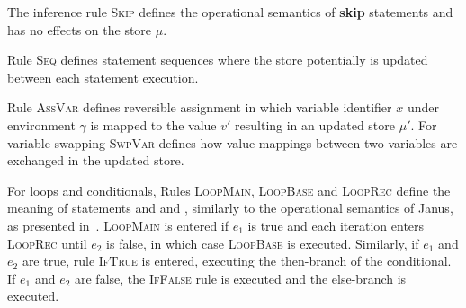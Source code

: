 
The inference rule \textsc{Skip} defines the operational semantics of \textbf{skip} statements and has no effects on the store $\mu$.

Rule \textsc{Seq} defines statement sequences where the store potentially is updated between each statement execution. 

Rule \textsc{AssVar} defines reversible assignment in which variable identifier $x$ under environment $\gamma$ is mapped to the value $v'$ resulting in an updated store $\mu'$. For variable swapping \textsc{SwpVar} defines how value mappings between two variables are exchanged in the updated store.

For loops and conditionals, Rules \textsc{LoopMain}, \textsc{LoopBase} and \textsc{LoopRec} define the meaning of  statements and  and , similarly to the operational semantics of Janus, as presented in~\cite{ty:ejanus}. \textsc{LoopMain} is entered if $e_1$ is true and each iteration enters \textsc{LoopRec} until $e_2$ is false, in which case \textsc{LoopBase} is executed. Similarly, if $e_1$ and $e_2$ are true, rule \textsc{IfTrue} is entered, executing the then-branch of the conditional. If $e_1$ and $e_2$ are false, the \textsc{IfFalse} rule is executed and the else-branch is executed.

